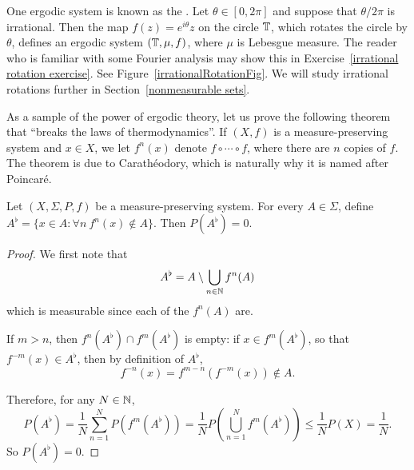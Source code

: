 \begin{example}\label{irrationalRotation}
One ergodic system is known as the .
Let $\theta \in [0, 2\pi]$ and suppose that $\theta/2\pi$ is irrational.
Then the map $f(z) = e^{i\theta}z$ on the circle $\mathbb{T}$, which rotates the circle by $\theta$, defines an ergodic system $(\mathbb{T}, \mu, f)$, where $\mu$ is Lebesgue measure.
The reader who is familiar with some Fourier analysis may show this in Exercise~\ref{irrational rotation exercise}.
See Figure~\ref{irrationalRotationFig}. We will study irrational rotations further in Section~\ref{nonmeasurable sets}.
\end{example}

\begin{subsec}
As a sample of the power of ergodic theory, let us prove the following theorem that ``breaks the laws of thermodynamics''.
If $(X, f)$ is a measure-preserving system and $x \in X$, we let $f^{n}(x)$ denote $f \circ \cdots \circ f$, where there are $n$ copies of $f$.
The theorem is due to Carathéodory, which is naturally why it is named after Poincar\'e.
\end{subsec}

\begin{theorem}
Let $(X, \Sigma, P, f)$ be a measure-preserving system.
For every $A \in \Sigma$, define $A^{\flat} = \{x \in A: \forall n~f^{n}(x) \notin A\}$.
Then $P(A^{\flat}) = 0$.
\end{theorem}
\begin{proof}
We first note that
\[A^{\flat} = A \setminus \bigcup_{n \in \mathbb{N}} f^{n}(A)\]
which is measurable since each of the $f^{n}(A)$ are.

If $m > n$, then $f^{n}(A^{\flat}) \cap f^{m}(A^{\flat})$ is empty: if $x \in f^{m}(A^{\flat})$, so that $f^{-m}(x) \in A^{\flat}$, then by definition of $A^{\flat}$,
\[f^{-n}(x) = f^{m-n}(f^{-m}(x)) \notin A.\]

Therefore, for any $N \in \mathbb{N}$,
\[P(A^{\flat}) = \frac{1}{N} \sum_{n=1}^{N} P(f^{m}(A^{\flat})) = \frac{1}{N} P\left(\bigcup_{n=1}^{N} f^{m}(A^{\flat})\right) \leq \frac{1}{N} P(X) = \frac{1}{N}.\]
So $P(A^{\flat}) = 0$.
\end{proof}

